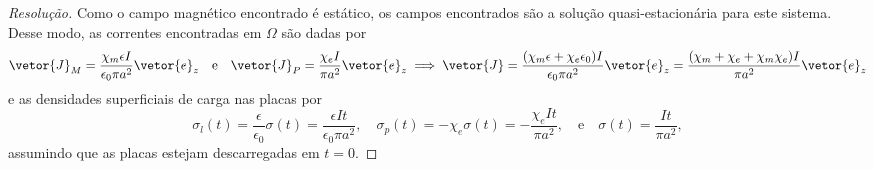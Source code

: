 \begin{proof}[Resolução]
    Como o campo magnético encontrado é estático, os campos encontrados são a solução quasi-estacionária para este sistema. Desse modo, as correntes encontradas em \(\Omega\) são dadas por
    \begin{equation*}
        \vetor{J}_M = \frac{\chi_m \epsilon I}{\epsilon_0 \pi a^2}\vetor{e}_z\quad\text{e}\quad
        \vetor{J}_P = \frac{\chi_e I}{\pi a^2}\vetor{e}_z \implies \vetor{J} = \frac{(\chi_m \epsilon + \chi_e \epsilon_0)I}{\epsilon_0 \pi a^2}\vetor{e}_z = \frac{(\chi_m + \chi_e + \chi_m \chi_e)I}{\pi a^2}\vetor{e}_z
    \end{equation*}
    e as densidades superficiais de carga nas placas por
    \begin{equation*}
        \sigma_l(t) = \frac{\epsilon}{\epsilon_0} \sigma(t) = \frac{\epsilon It}{\epsilon_0 \pi a^2},\quad
        \sigma_p(t) = - \chi_e \sigma(t) = -\frac{\chi_e It}{\pi a^2},\quad\text{e}\quad
        \sigma(t) = \frac{It}{\pi a^2},
    \end{equation*}
    assumindo que as placas estejam descarregadas em \(t = 0\).


\end{proof}

